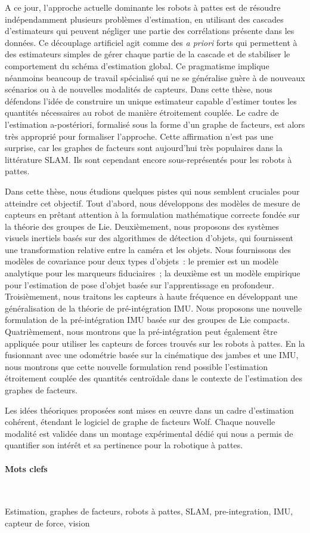 A ce jour, l'approche actuelle dominante les robots à pattes est de résoudre
indépendamment plusieurs problèmes d'estimation, en utilisant des cascades d'estimateurs qui peuvent négliger une partie des corrélations présente dans les données.
Ce découplage artificiel agit comme des \textit{a priori} forts qui permettent à des estimateurs simples de gérer chaque partie de la cascade et de stabiliser 
le comportement du schéma d'estimation global. Ce pragmatisme implique néanmoins beaucoup de travail spécialisé qui ne se généralise guère à de 
nouveaux scénarios ou à de nouvelles modalités de capteurs.
Dans cette thèse, nous défendons l'idée de construire un unique estimateur capable d'estimer toutes les quantités nécessaires au robot de manière étroitement couplée.
Le cadre de l'estimation a-postériori, formalisé sous la forme d'un graphe de facteurs, est alors très approprié pour formaliser l'approche. Cette affirmation n'est pas une surprise, 
car les graphes de facteurs sont aujourd'hui très populaires dans la littérature SLAM. Ils sont cependant encore sous-représentés pour les robots à pattes.

Dans cette thèse, nous étudions quelques pistes qui nous semblent cruciales pour atteindre cet objectif. Tout d'abord, nous développons des modèles de mesure de 
capteurs en prêtant attention à la formulation mathématique correcte fondée sur la théorie des groupes de Lie.
Deuxièmement, nous proposons des systèmes visuels inertiels basés sur des algorithmes de détection d'objets, qui fournissent une transformation relative entre la caméra 
et les objets.
Nous fournissons des modèles de covariance pour deux types d'objets~: le premier est un modèle analytique pour les marqueurs fiduciaires~; la deuxième
est un modèle empirique pour l'estimation de pose d'objet basée sur l'apprentissage en profondeur.
Troisièmement, nous traitons les capteurs à haute fréquence en développant une généralisation de la théorie de pré-intégration IMU. Nous proposons une nouvelle 
formulation de la pré-intégration IMU basée sur des groupes de Lie compacts.
Quatrièmement, nous montrons que la pré-intégration peut également être appliquée pour utiliser les capteurs de forces trouvés sur les robots à pattes.
En la fusionnant avec une odométrie basée sur la cinématique des jambes et une IMU, nous montrons que cette nouvelle formulation rend possible l'estimation 
étroitement couplée des quantités centroïdale dans le contexte de l'estimation des graphes de facteurs.

Les idées théoriques proposées sont mises en œuvre dans un cadre d'estimation cohérent, étendant le logiciel de graphe de facteurs Wolf. 
Chaque nouvelle modalité est validée dans un montage expérimental dédié qui nous a permis de quantifier son intérêt et sa pertinence pour la robotique à pattes.


\paragraph{Mots clefs} ~

Estimation, graphes de facteurs, robots à pattes, SLAM, pre-integration, IMU, capteur de force, vision 


\noindent\makebox[\linewidth]{\rule{0.6\textwidth}{2pt}}

\normalsize